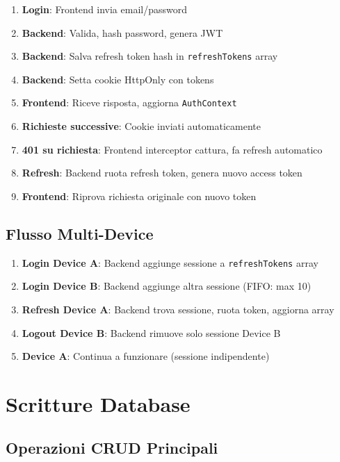 \documentclass[11pt,a4paper]{article}
\begin{document}
\begin{enumerate}
    \item \textbf{Login}: Frontend invia email/password
    \item \textbf{Backend}: Valida, hash password, genera JWT
    \item \textbf{Backend}: Salva refresh token hash in \texttt{refreshTokens} array
    \item \textbf{Backend}: Setta cookie HttpOnly con tokens
    \item \textbf{Frontend}: Riceve risposta, aggiorna \texttt{AuthContext}
    \item \textbf{Richieste successive}: Cookie inviati automaticamente
    \item \textbf{401 su richiesta}: Frontend interceptor cattura, fa refresh automatico
    \item \textbf{Refresh}: Backend ruota refresh token, genera nuovo access token
    \item \textbf{Frontend}: Riprova richiesta originale con nuovo token
\end{enumerate}

\subsection{Flusso Multi-Device}

\begin{enumerate}
    \item \textbf{Login Device A}: Backend aggiunge sessione a \texttt{refreshTokens} array
    \item \textbf{Login Device B}: Backend aggiunge altra sessione (FIFO: max 10)
    \item \textbf{Refresh Device A}: Backend trova sessione, ruota token, aggiorna array
    \item \textbf{Logout Device B}: Backend rimuove solo sessione Device B
    \item \textbf{Device A}: Continua a funzionare (sessione indipendente)
\end{enumerate}

\section{Scritture Database}

\subsection{Operazioni CRUD Principali}
\end{document}
